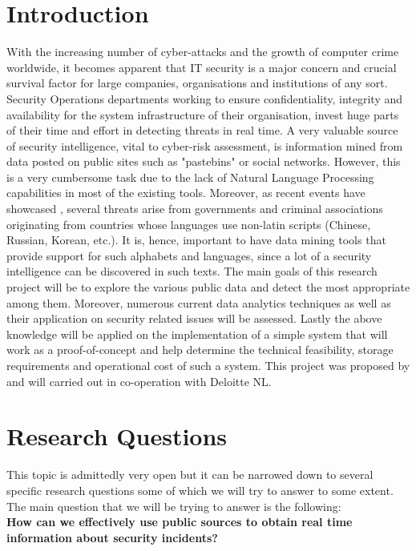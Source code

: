 \documentclass[12pt]{article}
\begin{document}
\section*{Introduction}
\parbox{\linewidth}{
With the increasing number of cyber-attacks and the growth of computer crime worldwide, it becomes apparent that IT security is a major concern and crucial survival factor for large companies, organisations and institutions of any sort. Security Operations departments working to ensure confidentiality, integrity and availability for the system infrastructure of their organisation, invest huge  parts \cite{cyber} of their time and effort in detecting threats in real time. A very valuable source of security intelligence, vital to cyber-risk assessment, is information mined from data posted on public sites such as "pastebins" or social networks. However, this is a very cumbersome task due to the lack of Natural Language Processing capabilities in most of the existing tools. Moreover, as recent events have showcased \cite{sony}, several threats arise from governments and criminal associations originating from countries whose languages use non-latin scripts (Chinese, Russian, Korean, etc.). It is, hence, important to have data mining tools that provide support for such alphabets and languages, since a lot of a security intelligence can be discovered in such texts. The main goals of this research project will be to explore the various public data and detect the most appropriate among them. Moreover, numerous current data analytics techniques as well as their application on security related issues will be assessed. Lastly the above knowledge will be applied on the implementation of a simple system that will work as a proof-of-concept and help determine the technical feasibility, storage requirements and operational cost of such a system. This project was proposed by and will carried out in co-operation with Deloitte NL. 
}
\newpage
\section{Research Questions}
This topic is admittedly very open but it can be narrowed down to several specific research questions some of which we will try to answer to some extent. The main question that we will be trying to answer is the following:\\[0.1cm]

\noindent
\textbf{How can we effectively use public sources to obtain real time information about security incidents?}\\[0.1cm]
\end{document}
